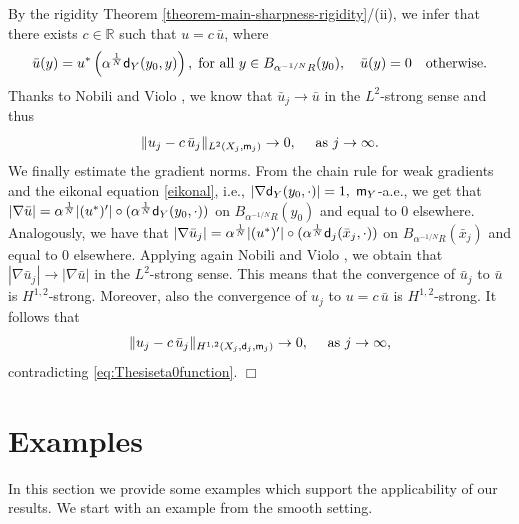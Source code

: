 \documentclass[11pt, reqno]{amsart}
\numberwithin{equation}{section}
\begin{document}
 By the rigidity Theorem \ref{theorem-main-sharpness-rigidity}/(ii), we infer that there exists $c\in \mathbb{R}$ such that $u= c\,  \bar u$,  where
\begin{equation*}
\bar u(y)=  u^*\left(\alpha^{\frac{1}{N}}{\sf d}_Y(y_0,y)\right),\; \text{for all }y\in B_{\alpha^{-{1}/{N}}R}(y_0), \quad \bar u(y)=0 \quad  \text{otherwise}.
 \end{equation*}
 Thanks to Nobili and Violo \cite[Lemma 7.2]{NV-Adv}, we know that $\bar u_j\to \bar u$ in the $L^{2}$-strong sense and thus 
 \begin{equation}\label{eq:ujtocbarujL2}
 \| u_j- c\, \bar u_j\|_{L^2(X_j, {\sf m}_j)} \to 0, \quad \text{ as } j\to \infty.
 \end{equation}
 We finally estimate the gradient norms. From the chain rule for weak gradients and the eikonal equation \eqref{eikonal}, i.e.,  $|\nabla {\sf d}_Y(y_0, \cdot)|=1,$ ${\sf m}_Y$-a.e., we get that 
 $|\nabla \bar u|= \alpha^{\frac{1}{N}} |(u^*)'| \circ (\alpha^{\frac{1}{N}}{\sf d}_Y(y_0, \cdot))$ on $B_{\alpha^{-{1}/{N}}R}(y_0)$ and  equal to $0$ elsewhere. Analogously, we have that  $|\nabla \bar u_j|= \alpha^{\frac{1}{N}} |(u^*)'| \circ (\alpha^{\frac{1}{N}}{\sf d}_j(\bar{x}_j, \cdot))$ on $B_{\alpha^{-{1}/{N}}R}(\bar{x}_j)$ and  equal to $0$ elsewhere.
Applying again Nobili and Violo \cite[Lemma 7.2]{NV-Adv}, we obtain that $|\nabla \bar u_j|\to |\nabla \bar u|$ in the $L^{2}$-strong sense. This means that the convergence of $ \bar u_j$ to $\bar u$ is $H^{1,2}$-strong. Moreover, also the convergence of $u_j$ to $u=c\, \bar u$ is $H^{1,2}$-strong. It follows that
  \begin{equation}\label{eq:ujtocbarujW12}
 \| u_j- c\, \bar u_j\|_{H^{1,2}(X_j, {\sf d}_j,  {\sf m}_j)} \to 0, \quad \text{ as } j\to \infty,
 \end{equation}
 contradicting \eqref{eq:Thesiseta0function}.
  \hfill$\Box$
	
	
	\section{Examples} 	
	
	In this section we provide some examples which support the applicability of our results. We start with an example from the smooth setting. 
	
\end{document}
